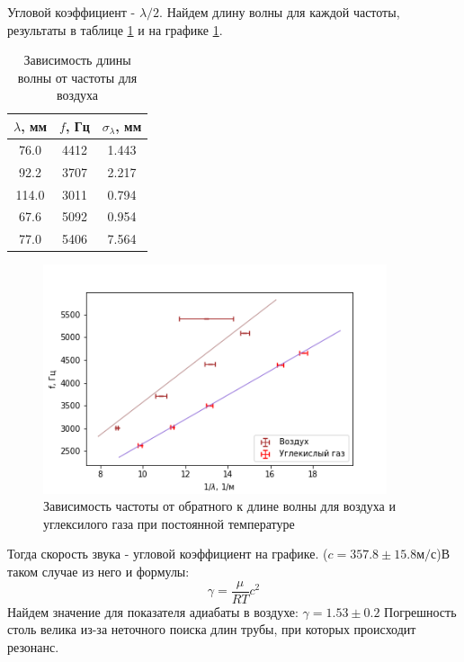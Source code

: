 \documentclass[a4paper,12pt]{article} %
\begin{document}
Угловой коэффициент - $\lambda/2$. Найдем длину волны для каждой частоты, результаты в таблице \ref{tbl:lambda_f} и на графике \ref{img:lambda_f}.

\begin{table}[h!] \caption{Зависимость длины волны от частоты для воздуха} \label{tbl:lambda_f} \begin{tabular}{|c|c|c|} \hline $\lambda$, мм & $f$, Гц & $\sigma_\lambda$, мм \\ \hline 76.0 & 4412 & 1.443 \\ \hline 92.2 & 3707 & 2.217 \\ \hline 114.0 & 3011 & 0.794 \\ \hline 67.6 & 5092 & 0.954 \\ \hline 77.0 & 5406 & 7.564 \\ \hline \end{tabular} \end{table}

\begin{figure}[h!]
\begin{center}
\includegraphics[width=0.9\textwidth]{f(la)}
\end{center}
\caption{Зависимость частоты от обратного к длине волны для воздуха и углексилого газа при постоянной температуре} \label{img:lambda_f}
\end{figure}

Тогда скорость звука - угловой коэффициент на графике. ($c= 357.8 \pm 15.8 м/с$)В таком случае из него и формулы:
\begin{equation}
\gamma = \frac{\mu}{RT}c^2
\end{equation}
Найдем значение для показателя адиабаты в воздухе:
$\gamma = 1.53 \pm 0.2$
Погрешность столь велика из-за неточного поиска длин трубы, при которых происходит резонанс.
\end{document}
